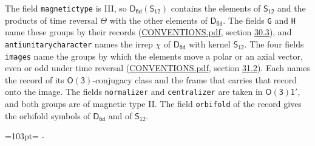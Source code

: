 \documentclass[10pt,a4paper]{article}
\newcommand{\needspace}[1]{\par\penalty-100\begingroup\dimen0=#1\relax\dimen2=\pagegoal
  \advance\dimen2-\pagetotal\ifdim\dimen0>\dimen2\relax\ifdim\dimen2>0pt\vfil\break\fi\fi
  \endgroup}
\numberwithin{equation}{section}
\newcommand{\grp}[1]{\mathsf{#1}}
\begin{document}
The field \texttt{magnetictype} is III, so $\grp{D_{6d}}(\grp{S_{12}})$ contains the elements of $\grp{S_{12}}$ and the products of time reversal $\varTheta$ with the other elements of $\grp{D_{6d}}$. The fields \texttt{G} and \texttt{H} name these groups by their records (\href{../../CONVENTIONS.pdf}{CONVENTIONS.pdf}, section \href{../../CONVENTIONS.pdf\#conv.30.3}{30.3}), and \texttt{antiunitarycharacter} names the irrep $\chi$ of $\grp{D_{6d}}$ with kernel $\grp{S_{12}}$. The four fields \texttt{images} name the groups by which the elements move a polar or an axial vector, even or odd under time reversal (\href{../../CONVENTIONS.pdf}{CONVENTIONS.pdf}, section \href{../../CONVENTIONS.pdf\#conv.31.2}{31.2}). Each names the record of its $\grp{O(3)}$-conjugacy class and the frame that carries that record onto the image. The fields \texttt{normalizer} and \texttt{centralizer} are taken in $\grp{O(3)1'}$, and both groups are of magnetic type II. The field \texttt{orbifold} of the record gives the orbifold symbols of $\grp{D_{6d}}$ and of $\grp{S_{12}}$.
\needspace{103pt}
\end{document}
